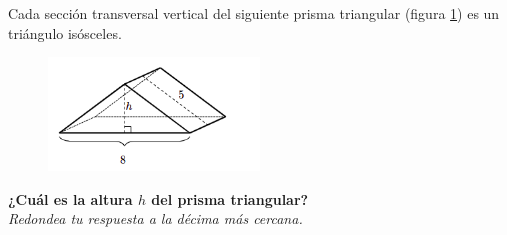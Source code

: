 Cada sección transversal vertical del siguiente prisma triangular (figura \ref{fig:pitagoras3D_pris_01}) es un triángulo isósceles.
\begin{figure}[H]
    \begin{center}
        \includegraphics[width=0.5\textwidth]{../images/pitagoras3D_pris_01.png}
    \end{center}
    \caption{}
    \label{fig:pitagoras3D_pris_01}
\end{figure}
\textbf{¿Cuál es la altura $h$ del prisma triangular?}\\
\textit{Redondea tu respuesta a la décima más cercana.}